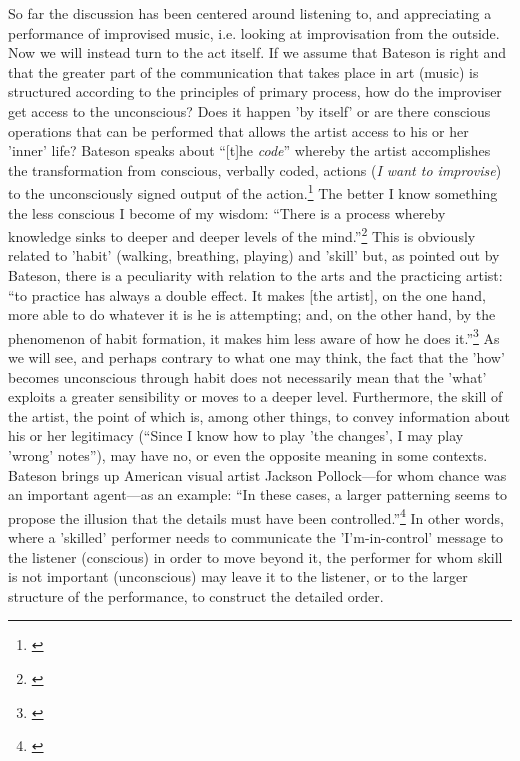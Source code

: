 So far the discussion has been centered around listening to, and
appreciating a performance of improvised music, i.e. looking at
improvisation from the outside. Now we will instead turn to the act
itself. If we assume that Bateson is right and that the greater part
of the communication that takes place in art (music) is structured
according to the principles of primary process, how do the
improviser get access to the unconscious? Does it happen 'by itself'
or are there conscious operations that can be performed that allows
the artist access to his or her 'inner' life? Bateson speaks about
``[t]he \emph{code}'' whereby the artist accomplishes the
transformation from conscious, verbally coded, actions (\emph{I want
  to improvise}) to the unconsciously signed output of the
action.\footnote{\citet[p. 130]{bateson72}} 
The better I know something the less conscious I become of my wisdom:
``There is a process whereby knowledge sinks to deeper and deeper
levels of the mind.''\footnote{\citet[p. 135]{bateson72}} This is obviously
related to 'habit' (walking, breathing, playing) and 'skill' but, as
pointed out by Bateson, there is a peculiarity with relation to the
arts and the practicing artist: ``to practice has always a double
effect. It makes [the artist], on the one hand, more able to do
whatever it is he is attempting; and, on the other hand, by the
phenomenon of habit formation, it makes him less aware of how he does
it.''\footnote{\citet[p. 138]{bateson72}} As we will see, and perhaps contrary to
what one may think, the fact that the 'how' becomes unconscious
through habit does not necessarily mean that the 'what' exploits a
greater sensibility or moves to a deeper level. Furthermore, the skill
of the artist, the point of which is, among other things, to convey
information about his or her legitimacy (``Since I know how to play
'the changes', I may play 'wrong' notes''), may have no, or even the
opposite meaning in some contexts. Bateson brings up American visual
artist Jackson Pollock---for whom chance was an important agent---as
an example: ``In these cases, a larger patterning seems to propose the
illusion that the details must have been
controlled.''\footnote{\citet[p. 148]{bateson72}} In other words, where a
'skilled' performer needs to communicate the 'I'm-in-control' message
to the listener (conscious) in order to move beyond it, the performer
for whom skill is not important (unconscious) may leave it to the
listener, or to the larger structure of the performance, to construct
the detailed order.

